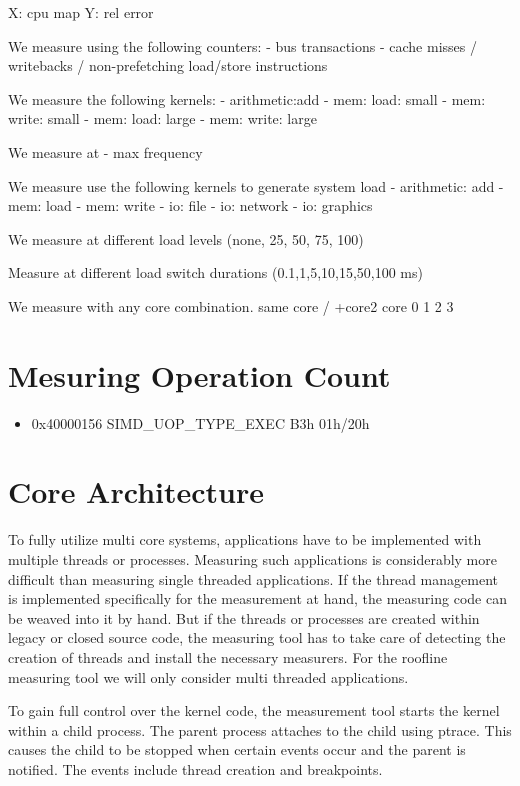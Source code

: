 \documentclass[a4paper,12pt]{article}
\begin{document}
X: cpu map Y: rel error

We measure using the following counters:
- bus transactions
- cache misses / writebacks / non-prefetching load/store instructions

We measure the following kernels:
- arithmetic:add
- mem: load: small 
- mem: write: small
- mem: load: large
- mem: write: large

We measure at 
- max frequency

We measure use the following kernels to generate system load
- arithmetic: add
- mem: load
- mem: write
- io: file 
- io: network
- io: graphics

We measure at different load levels (none, 25, 50, 75, 100)

Measure at different load switch durations (0.1,1,5,10,15,50,100 ms)

We measure with any core combination.
same core / +core2
core 0 1 2 3

\section{Mesuring Operation Count}
\begin{itemize}
\item 0x40000156   SIMD\_UOP\_TYPE\_EXEC B3h 01h/20h
\end{itemize}


\section{Core Architecture}
To fully utilize multi core systems, applications have to be implemented with multiple threads or processes. Measuring such applications is considerably more difficult than measuring single threaded applications. If the thread management is implemented specifically for the measurement at hand, the measuring code can be weaved into it by hand. But if the threads or processes are created within legacy or closed source code, the measuring tool has to take care of detecting the creation of threads and install the necessary measurers. For the roofline measuring tool we will only consider multi threaded applications.

To gain full control over the kernel code, the measurement tool starts the kernel within a child process. The parent process attaches to the child using ptrace. This causes the child to be stopped when certain events occur and the parent is notified. The events include thread creation and breakpoints.
\end{document}
